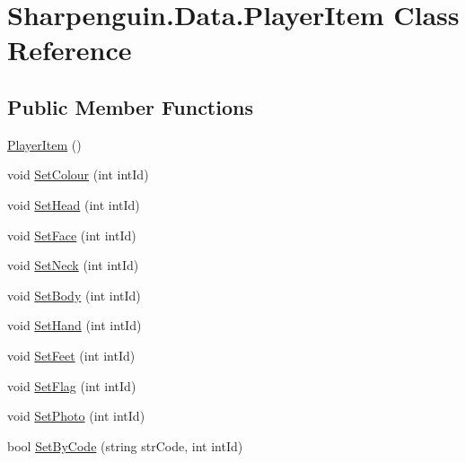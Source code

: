\hypertarget{classSharpenguin_1_1Data_1_1PlayerItem}{\section{Sharpenguin.\-Data.\-Player\-Item Class Reference}
\label{classSharpenguin_1_1Data_1_1PlayerItem}
}
\subsection*{Public Member Functions}
\begin{DoxyCompactItemize}
\item 
\hyperlink{classSharpenguin_1_1Data_1_1PlayerItem_a1c07974253f917af09132d8f6290ddbf}{Player\-Item} ()
\item 
void \hyperlink{classSharpenguin_1_1Data_1_1PlayerItem_a0ba43aab58727760a20d0197519a2bd5}{Set\-Colour} (int int\-Id)
\item 
void \hyperlink{classSharpenguin_1_1Data_1_1PlayerItem_a7e92eb001d9fda4ac63a28d72e1dcb10}{Set\-Head} (int int\-Id)
\item 
void \hyperlink{classSharpenguin_1_1Data_1_1PlayerItem_acf3bf50435cba4d176a907acda3430a0}{Set\-Face} (int int\-Id)
\item 
void \hyperlink{classSharpenguin_1_1Data_1_1PlayerItem_aa85fa149653805e76d0b08b1152e0628}{Set\-Neck} (int int\-Id)
\item 
void \hyperlink{classSharpenguin_1_1Data_1_1PlayerItem_a6722340ee606ee2882b1d0911e6a7076}{Set\-Body} (int int\-Id)
\item 
void \hyperlink{classSharpenguin_1_1Data_1_1PlayerItem_a717f23521a7e4b2fa8ccb3a621973a95}{Set\-Hand} (int int\-Id)
\item 
void \hyperlink{classSharpenguin_1_1Data_1_1PlayerItem_a28e1f569f1a1cafa354d9332947a3bc1}{Set\-Feet} (int int\-Id)
\item 
void \hyperlink{classSharpenguin_1_1Data_1_1PlayerItem_a4d8b52ac429a1c50918299fb92bd228f}{Set\-Flag} (int int\-Id)
\item 
void \hyperlink{classSharpenguin_1_1Data_1_1PlayerItem_a340acc5aa92c46e031488f9d0859acbc}{Set\-Photo} (int int\-Id)
\item 
bool \hyperlink{classSharpenguin_1_1Data_1_1PlayerItem_a2db7e2bddf02a5e72a1ea7e819a8cf40}{Set\-By\-Code} (string str\-Code, int int\-Id)
\end{DoxyCompactItemize}
